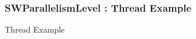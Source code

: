 \begin{frame}[fragile]\frametitle{SWParallelismLevel : Thread Example}

 \begin{block}{Thread Example}
    
  \end{block}
  
\end{frame}
